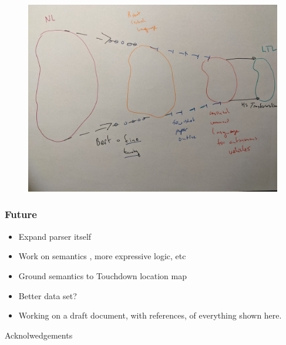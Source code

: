 \documentclass{beamer}
\begin{document}
\begin{frame}
\frametitle{}
\begin{figure}
\hspace*{-3mm}%
   \includegraphics[width= \paperwidth]{pics/three.jpg}
\end{figure}
\end{frame}

\begin{frame}
\frametitle{Future}

\begin{itemize} 
\item Expand parser itself
\item Work on semantics , more expressive logic, etc
\item Ground semantics to Touchdown location map
\item Better data set?
\item Working on a draft document, with references, of everything shown here.
\end{itemize} 

\end{frame}

\begin{frame}
Acknolwedgements
\end{frame}
\end{document}
